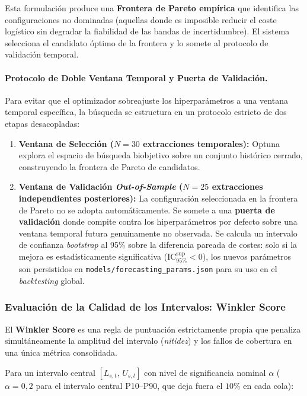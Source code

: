 Esta formulación produce una \textbf{Frontera de Pareto empírica} que identifica las configuraciones no dominadas (aquellas donde es imposible reducir el coste logístico sin degradar la fiabilidad de las bandas de incertidumbre). El sistema selecciona el candidato óptimo de la frontera y lo somete al protocolo de validación temporal.

\paragraph{Protocolo de Doble Ventana Temporal y Puerta de Validación.}
Para evitar que el optimizador sobreajuste los hiperparámetros a una ventana temporal específica, la búsqueda se estructura en un protocolo estricto de dos etapas desacopladas:

\begin{enumerate}
    \item \textbf{Ventana de Selección ($N=30$ extracciones temporales):} Optuna explora el espacio de búsqueda biobjetivo sobre un conjunto histórico cerrado, construyendo la frontera de Pareto de candidatos.
    \item \textbf{Ventana de Validación \textit{Out-of-Sample} ($N=25$ extracciones independientes posteriores):} La configuración seleccionada en la frontera de Pareto no se adopta automáticamente. Se somete a una \textbf{puerta de validación} donde compite contra los hiperparámetros por defecto sobre una ventana temporal futura genuinamente no observada. Se calcula un intervalo de confianza \textit{bootstrap} al 95\% sobre la diferencia pareada de costes: solo si la mejora es estadísticamente significativa ($\text{IC}_{95\%}^{\text{sup}} < 0$), los nuevos parámetros son persistidos en \texttt{models/forecasting\_params.json} para su uso en el \textit{backtesting} global.
\end{enumerate}

\subsubsection{Evaluación de la Calidad de los Intervalos: Winkler Score}
\label{sec:winkler}
El \textbf{Winkler Score} \cite{winkler1972scoring} es una regla de puntuación estrictamente propia que penaliza simultáneamente la amplitud del intervalo (\textit{nitidez}) y los fallos de cobertura en una única métrica consolidada.

Para un intervalo central $[L_{s,t},\, U_{s,t}]$ con nivel de significancia nominal $\alpha$ ($\alpha = 0{,}2$ para el intervalo central P10--P90, que deja fuera el $10\%$ en cada cola):

